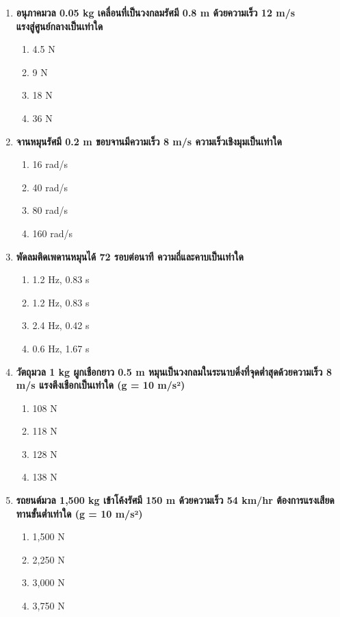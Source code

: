 \documentclass[12pt]{article}
\begin{document}
\begin{enumerate}
\begin{enumerate}[label=\alph*)]
\item 98 N
\item 196 N
\item 392 N
\end{enumerate}
\item \textbf{อนุภาคมวล 0.05 kg เคลื่อนที่เป็นวงกลมรัศมี 0.8 m ด้วยความเร็ว 12 m/s แรงสู่ศูนย์กลางเป็นเท่าใด}
\begin{enumerate}[label=\alph*)]
\item 4.5 N
\item 9 N
\item 18 N
\item 36 N
\end{enumerate}
\item \textbf{จานหมุนรัศมี 0.2 m ขอบจานมีความเร็ว 8 m/s ความเร็วเชิงมุมเป็นเท่าใด}
\begin{enumerate}[label=\alph*)]
\item 16 rad/s
\item 40 rad/s
\item 80 rad/s
\item 160 rad/s
\end{enumerate}
\item \textbf{พัดลมติดเพดานหมุนได้ 72 รอบต่อนาที ความถี่และคาบเป็นเท่าใด}
\begin{enumerate}[label=\alph*)]
\item 1.2 Hz, 0.83 s
\item 1.2 Hz, 0.83 s
\item 2.4 Hz, 0.42 s
\item 0.6 Hz, 1.67 s
\end{enumerate}
\item \textbf{วัตถุมวล 1 kg ผูกเชือกยาว 0.5 m หมุนเป็นวงกลมในระนาบดิ่งที่จุดต่ำสุดด้วยความเร็ว 8 m/s แรงตึงเชือกเป็นเท่าใด (g = 10 m/s²)}
\begin{enumerate}[label=\alph*)]
\item 108 N
\item 118 N
\item 128 N
\item 138 N
\end{enumerate}
\item \textbf{รถยนต์มวล 1,500 kg เข้าโค้งรัศมี 150 m ด้วยความเร็ว 54 km/hr ต้องการแรงเสียดทานขั้นต่ำเท่าใด (g = 10 m/s²)}
\begin{enumerate}[label=\alph*)]
\item 1,500 N
\item 2,250 N
\item 3,000 N
\item 3,750 N

\end{enumerate}
\end{enumerate}
\end{document}
